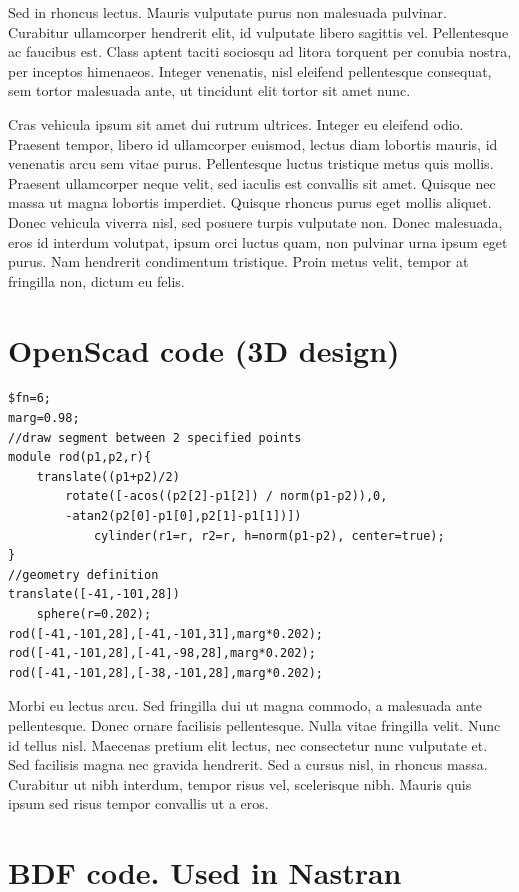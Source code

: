 Sed in rhoncus lectus. Mauris vulputate purus non malesuada pulvinar. Curabitur ullamcorper hendrerit elit, id vulputate libero sagittis vel. Pellentesque ac faucibus est. Class aptent taciti sociosqu ad litora torquent per conubia nostra, per inceptos himenaeos. Integer venenatis, nisl eleifend pellentesque consequat, sem tortor malesuada ante, ut tincidunt elit tortor sit amet nunc.

Cras vehicula ipsum sit amet dui rutrum ultrices. Integer eu eleifend odio. Praesent tempor, libero id ullamcorper euismod, lectus diam lobortis mauris, id venenatis arcu sem vitae purus. Pellentesque luctus tristique metus quis mollis. Praesent ullamcorper neque velit, sed iaculis est convallis sit amet. Quisque nec massa ut magna lobortis imperdiet. Quisque rhoncus purus eget mollis aliquet. Donec vehicula viverra nisl, sed posuere turpis vulputate non. Donec malesuada, eros id interdum volutpat, ipsum orci luctus quam, non pulvinar urna ipsum eget purus. Nam hendrerit condimentum tristique.
Proin metus velit, tempor at fringilla non, dictum eu felis. 

\section{OpenScad code (3D design)}

\begin{lstlisting}[language=OpenSCAD, caption=OpenSCAD example.]
$fn=6;
marg=0.98;
//draw segment between 2 specified points
module rod(p1,p2,r){ 
    translate((p1+p2)/2)
        rotate([-acos((p2[2]-p1[2]) / norm(p1-p2)),0,
        -atan2(p2[0]-p1[0],p2[1]-p1[1])])
            cylinder(r1=r, r2=r, h=norm(p1-p2), center=true);
}
//geometry definition
translate([-41,-101,28])
    sphere(r=0.202);
rod([-41,-101,28],[-41,-101,31],marg*0.202);
rod([-41,-101,28],[-41,-98,28],marg*0.202);
rod([-41,-101,28],[-38,-101,28],marg*0.202);

\end{lstlisting}

Morbi eu lectus arcu. Sed fringilla dui ut magna commodo, a malesuada ante pellentesque. Donec ornare facilisis pellentesque. Nulla vitae fringilla velit. Nunc id tellus nisl. Maecenas pretium elit lectus, nec consectetur nunc vulputate et. Sed facilisis magna nec gravida hendrerit. Sed a cursus nisl, in rhoncus massa. Curabitur ut nibh interdum, tempor risus vel, scelerisque nibh. Mauris quis ipsum sed risus tempor convallis ut a eros.

\section{BDF code. Used in Nastran}

